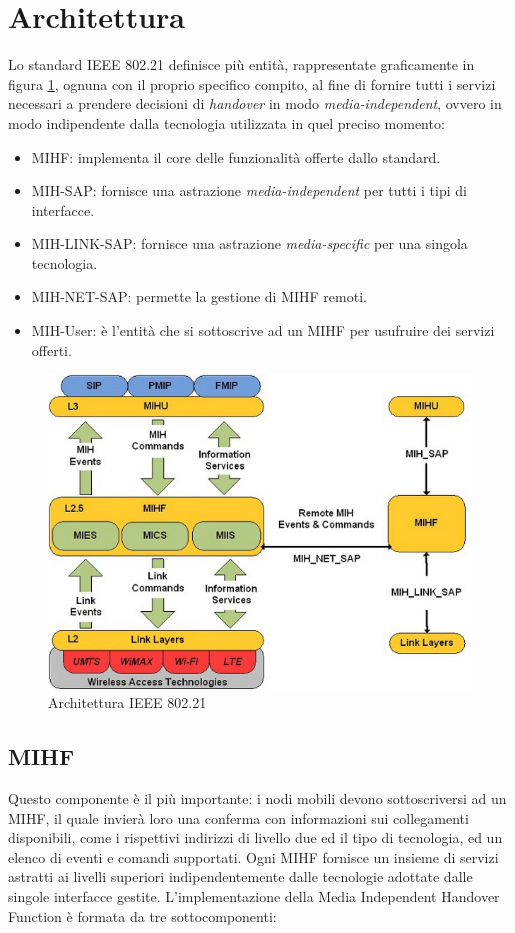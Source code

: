 \section{Architettura}
Lo standard IEEE 802.21 definisce più entità, rappresentate graficamente in figura \ref{fig:80221arch}, ognuna con il proprio specifico compito, al fine di fornire tutti i servizi necessari a prendere decisioni di {\em handover} in modo {\em media-independent}, ovvero in modo indipendente dalla tecnologia utilizzata in quel preciso momento:
\begin{itemize}
\item MIHF: implementa il core delle funzionalità offerte dallo standard.
\item MIH-SAP: fornisce una astrazione {\em media-independent} per tutti i tipi di interfacce.
\item MIH-LINK-SAP: fornisce una astrazione {\em media-specific} per una singola tecnologia.
\item MIH-NET-SAP: permette la gestione di MIHF remoti.
\item MIH-User: è l'entità che si sottoscrive ad un MIHF per usufruire dei servizi offerti.
\end{itemize}

\begin{figure}[h!]
\centering
\includegraphics[scale=0.9]{ieee80221.jpg}
\caption{Architettura IEEE 802.21}
\label{fig:80221arch}
\end{figure}
\subsection{MIHF}
Questo componente è il più importante: i nodi mobili devono sottoscriversi ad un MIHF, il quale invierà loro una conferma con informazioni sui collegamenti disponibili, come i rispettivi indirizzi di livello due ed il tipo di tecnologia, ed un elenco di eventi e comandi supportati. Ogni MIHF fornisce un insieme di servizi astratti ai livelli superiori indipendentemente dalle tecnologie adottate dalle singole interfacce gestite.
L'implementazione della Media Independent Handover Function è formata da tre sottocomponenti:

